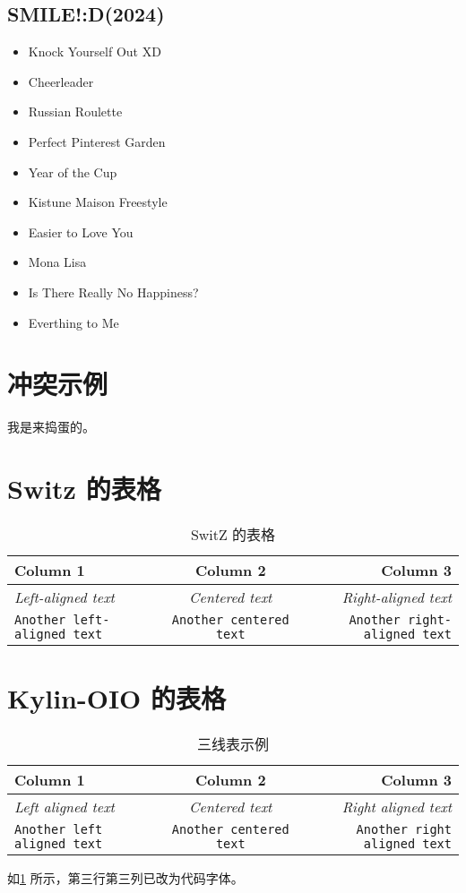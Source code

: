 \documentclass{article}
\begin{document}
\subsection{SMILE!:D(2024)}
\begin{itemize}
    \item Knock Yourself Out XD
    \item Cheerleader
    \item Russian Roulette
    \item Perfect Pinterest Garden
    \item Year of the Cup
    \item Kistune Maison Freestyle
    \item Easier to Love You
    \item Mona Lisa
    \item Is There Really No Happiness?
    \item Everthing to Me
\end{itemize}

    \section{冲突示例}

    我是来捣蛋的。

    \section{ Switz 的表格}
    \begin{table}[h]
        \centering%
        \begin{tabular}{lcr}
            \toprule
            \textbf{Column 1} & \textbf{Column 2} & \textbf{Column 3} \\
            \midrule
            \textit{Left-aligned text} & \textit{Centered text} & \textit{Right-aligned text} \\
            \texttt{Another left-aligned text} & \texttt{Another centered text} & \texttt{Another right-aligned text} \\
            \bottomrule
        \end{tabular}
        \caption{SwitZ 的表格}
    \end{table}
    \section{ Kylin-OIO 的表格}
    \begin{table}[]
        \centering
        \begin{tabular}{l c r} 
        \hline
          Column 1 & Column 2 & Column 3 \\
          \hline
           \textit{Left aligned text}  & \textit{Centered text} & \textit{Right aligned text} \\
           \texttt{Another left aligned text} & \texttt{Another centered text} & \texttt{Another right aligned text}\\
           \hline
        \end{tabular}
        \caption{三线表示例}
        \label{tab:my_table}
    \end{table}
    
    如\ref{tab:my_table} 所示，第三行第三列已改为代码字体。
\end{document}
